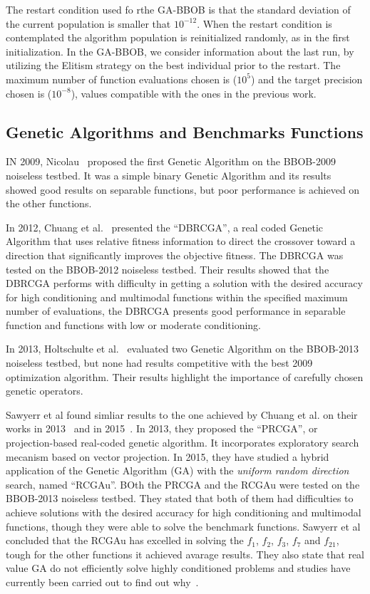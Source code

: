 The restart condition used fo rthe  GA-BBOB is that the standard deviation of the current population is smaller that $10^{-12}$. When the restart condition is contemplated the algorithm population is reinitialized randomly, as in the first initialization. In the GA-BBOB, we consider information about the last run, by utilizing the Elitism strategy on the best individual prior to the restart. The maximum number of function evaluations chosen is ($10^5$) and the target precision chosen is ($10^{-8}$), values compatible with the ones in the previous work.

\subsection{Genetic Algorithms and Benchmarks Functions}

IN 2009, Nicolau~\cite{nicolau2009application} proposed the first Genetic Algorithm on the BBOB-2009 noiseless testbed. It was a simple binary Genetic Algorithm and its results showed good results on separable functions, but poor performance is achieved on the other functions.

In 2012, Chuang et al.~\cite{chuang2012black} presented the ``DBRCGA'', a real coded Genetic Algorithm that uses relative fitness information to direct the crossover toward a direction that significantly improves the objective fitness. The DBRCGA was tested on the BBOB-2012 noiseless testbed. Their results showed that the DBRCGA performs with difficulty in getting a solution with the desired accuracy for high conditioning and multimodal functions within the specified maximum number of evaluations, the DBRCGA presents good performance in separable function and functions with low or moderate conditioning.

In 2013, Holtschulte et al.~\cite{holtschulte2013benchmarking} evaluated two Genetic Algorithm on the BBOB-2013 noiseless testbed, but none had results competitive with the best 2009 optimization algorithm. Their results highlight the importance of carefully chosen genetic operators.

Sawyerr et al found simliar results to the one achieved by Chuang et al. on their works in 2013~\cite{sawyerr2013benchmarking} and in 2015~\cite{sawyerr2015benchmarking}. In 2013, they proposed the ``PRCGA'', or projection-based real-coded genetic algorithm. It incorporates exploratory search mecanism based on vector projection. In 2015, they have studied a hybrid application of the Genetic Algorithm (GA) with the \textit{uniform random direction} search, named ``RCGAu''. BOth the PRCGA and the RCGAu were tested on the BBOB-2013 noiseless testbed. They stated that both of them had difficulties to achieve solutions with the desired accuracy for high conditioning and multimodal functions, though they were able to solve the benchmark functions.  Sawyerr et al concluded that the RCGAu has excelled in solving the $f_1$, $f_2$, $f_3$, $f_7$ and $f_{21}$, tough for the other functions it achieved avarage results. They also state that real value GA do not efficiently solve highly conditioned problems and studies have currently been carried out to find out why~\cite{sawyerr2015benchmarking}.
